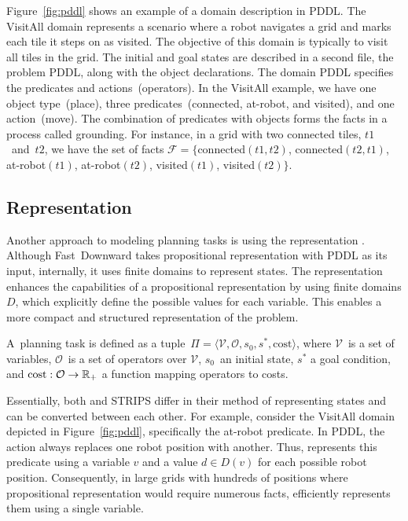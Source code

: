 Figure~\ref{fig:pddl} shows an example of a domain description in PDDL. The VisitAll domain represents a scenario where a robot navigates a grid and marks each tile it steps on as visited. The objective of this domain is typically to visit all tiles in the grid. The initial and goal states are described in a second file, the problem PDDL, along with the object declarations. The domain PDDL specifies the predicates and actions~(operators). In the VisitAll example, we have one object type~(place), three predicates~(connected, at-robot, and visited), and one action~(move). The combination of predicates with objects forms the facts in a process called grounding. For instance, in a grid with two connected tiles, $t1$~and~$t2$, we have the set of facts $\mathcal{F}=\{$connected$(t1,t2)$, \mbox{connected$(t2,t1)$}, \mbox{at-robot$(t1)$}, \mbox{at-robot$(t2)$}, \mbox{visited$(t1)$}, visited$(t2)\}$.

\subsection{\sas Representation}
\label{sec:background_sas}

Another approach to modeling planning tasks is using the \sas representation \cite{Backstrom.Nebel/1995}. Although Fast~Downward takes propositional representation with PDDL as its input, internally, it uses finite domains to represent states. The \sas representation enhances the capabilities of a propositional representation by using finite domains $D$, which explicitly define the possible values for each variable. This enables a more compact and structured representation of the problem.

\begin{definition}\label{def:sasplanningtask}
    A~\sas planning task is defined as a tuple~$\Pi=\langle\mathcal{V},\mathcal{O},s_0,s^*, \text{cost}\rangle$, where $\mathcal{V}$~is a set of variables, $\mathcal{O}$~is a set of operators over $\mathcal{V}$, $s_0$~an initial state, $s^*$ a goal condition, and $\text{cost}:\mathcal{O}\rightarrow\mathbb{R}_{+}$ a function mapping operators to costs.
\end{definition}

Essentially, both \sas and STRIPS differ in their method of representing states and can be converted between each other. For example, consider the VisitAll domain depicted in Figure~\ref{fig:pddl}, specifically the at-robot predicate. In PDDL, the action always replaces one robot position with another. Thus, \sas represents this predicate using a variable $v$ and a value $d \in D(v)$ for each possible robot position. Consequently, in large grids with hundreds of positions where propositional representation would require numerous facts, \sas efficiently represents them using a single variable.

